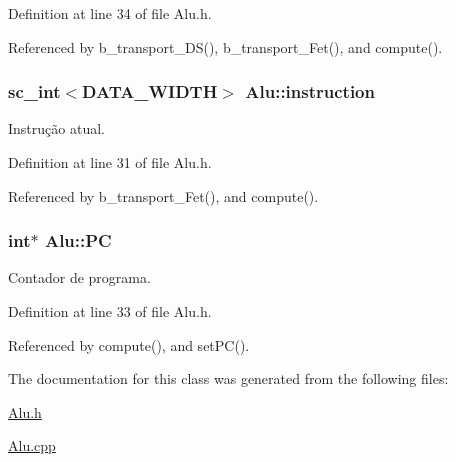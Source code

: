 Definition at line 34 of file Alu.\+h.



Referenced by b\+\_\+transport\+\_\+\+D\+S(), b\+\_\+transport\+\_\+\+Fet(), and compute().

\hypertarget{classAlu_a307709e37d80c03970b0165d29dfb4c4}{
\subsubsection[{instruction}]{\setlength{\rightskip}{0pt plus 5cm}sc\+\_\+int$<${\bf D\+A\+T\+A\+\_\+\+W\+I\+D\+T\+H}$>$ Alu\+::instruction\hspace{0.3cm}{\ttfamily [private]}}}\label{classAlu_a307709e37d80c03970b0165d29dfb4c4}
Instrução atual. 

Definition at line 31 of file Alu.\+h.



Referenced by b\+\_\+transport\+\_\+\+Fet(), and compute().

\hypertarget{classAlu_afc87096d954e9091302d7c1854a910e1}{
\subsubsection[{P\+C}]{\setlength{\rightskip}{0pt plus 5cm}int$\ast$ Alu\+::\+P\+C\hspace{0.3cm}{\ttfamily [private]}}}\label{classAlu_afc87096d954e9091302d7c1854a910e1}
Contador de programa. 

Definition at line 33 of file Alu.\+h.



Referenced by compute(), and set\+P\+C().



The documentation for this class was generated from the following files\+:\begin{DoxyCompactItemize}
\item 
\hyperlink{Alu_8h}{Alu.\+h}\item 
\hyperlink{Alu_8cpp}{Alu.\+cpp}\end{DoxyCompactItemize}
